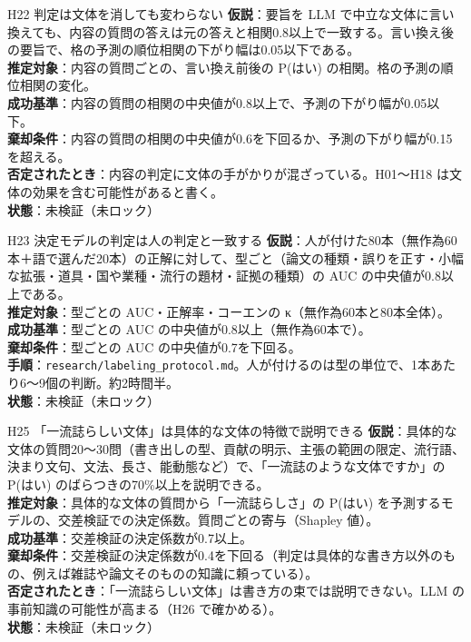 \documentclass[a4paper,10pt]{ltjsarticle}
\begin{document}
\begin{hypothesis}{H22 判定は文体を消しても変わらない}
\textbf{仮説}：要旨を LLM で中立な文体に言い換えても、内容の質問の答えは元の答えと相関0.8以上で一致する。言い換え後の要旨で、格の予測の順位相関の下がり幅は0.05以下である。\\
\textbf{推定対象}：内容の質問ごとの、言い換え前後の P(はい) の相関。格の予測の順位相関の変化。\\
\textbf{成功基準}：内容の質問の相関の中央値が0.8以上で、予測の下がり幅が0.05以下。\\
\textbf{棄却条件}：内容の質問の相関の中央値が0.6を下回るか、予測の下がり幅が0.15を超える。\\
\textbf{否定されたとき}：内容の判定に文体の手がかりが混ざっている。H01〜H18 は文体の効果を含む可能性があると書く。\\
\textbf{状態}：未検証（未ロック）
\end{hypothesis}

\begin{hypothesis}{H23 決定モデルの判定は人の判定と一致する}
\textbf{仮説}：人が付けた80本（無作為60本＋語で選んだ20本）の正解に対して、型ごと（論文の種類・誤りを正す・小幅な拡張・道具・国や業種・流行の題材・証拠の種類）の AUC の中央値が0.8以上である。\\
\textbf{推定対象}：型ごとの AUC・正解率・コーエンの κ（無作為60本と80本全体）。\\
\textbf{成功基準}：型ごとの AUC の中央値が0.8以上（無作為60本で）。\\
\textbf{棄却条件}：型ごとの AUC の中央値が0.7を下回る。\\
\textbf{手順}：\texttt{research/labeling\_protocol.md}。人が付けるのは型の単位で、1本あたり6〜9個の判断。約2時間半。\\
\textbf{状態}：未検証（未ロック）
\end{hypothesis}

\begin{hypothesis}{H25 「一流誌らしい文体」は具体的な文体の特徴で説明できる}
\textbf{仮説}：具体的な文体の質問20〜30問（書き出しの型、貢献の明示、主張の範囲の限定、流行語、決まり文句、文法、長さ、能動態など）で、「一流誌のような文体ですか」の P(はい) のばらつきの70\%以上を説明できる。\\
\textbf{推定対象}：具体的な文体の質問から「一流誌らしさ」の P(はい) を予測するモデルの、交差検証での決定係数。質問ごとの寄与（Shapley 値）。\\
\textbf{成功基準}：交差検証の決定係数が0.7以上。\\
\textbf{棄却条件}：交差検証の決定係数が0.4を下回る（判定は具体的な書き方以外のもの、例えば雑誌や論文そのものの知識に頼っている）。\\
\textbf{否定されたとき}：「一流誌らしい文体」は書き方の束では説明できない。LLM の事前知識の可能性が高まる（H26 で確かめる）。\\
\textbf{状態}：未検証（未ロック）
\end{hypothesis}
\end{document}
